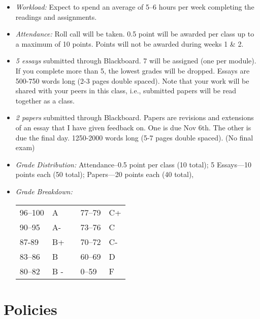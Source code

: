 \documentclass[article,oneside]{memoir}
\begin{document}
\begin{itemize}
\item \textit{Workload:} Expect to spend an average of 5--6 hours per week  completing the readings and assignments.

\item \textit{Attendance:} Roll call will be taken. 0.5 point will be awarded per class up to a maximum of 10 points. Points will not be awarded during weeks 1 \& 2. 

\item \textit{5 essays} submitted through Blackboard. 7 will be assigned (one per module). If you complete more than 5, the lowest grades will be dropped. Essays are 500-750 words long (2-3 pages double spaced). Note that your work will be shared with your peers in this class, i.e., submitted papers will be read together as a class. 

\item \textit{2 papers} submitted through Blackboard. Papers are revisions and extensions of an essay that I have given feedback on. One is due Nov 6th. The other is due the final day. 1250-2000 words long (5-7 pages double spaced). (No final exam)


\item \textit{Grade Distribution:} Attendance--0.5 point per class (10 total); 5 Essays---10 points each (50 total); Papers---20 points each (40 total),

\item \textit{Grade Breakdown:}

 \begin{tabular}{ | l | l | p{2cm} | l | l | }
    \hline 
96--100 & A  & &  77--79 &  C+ \\  
90--95 & A- & &  73--76 & C \\
87-89 & B+ &  &  70--72 & C- \\ 
83--86 & B  & &  60--69 & D\\
80--82 & B - & & 0--59 & F\\ \hline
    \end{tabular}


\end{itemize}





\section{Policies}
\end{document}

